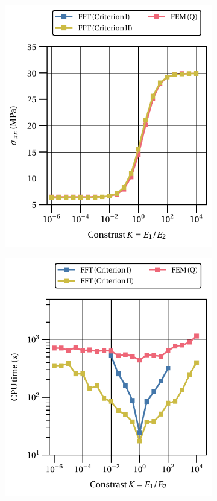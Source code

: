 \begin{figure}[hbt]
  \centering
	\begin{subfigure}[b]{0.49\textwidth}
    \centering
    \includegraphics[width=\textwidth]{figures/svk_2D_normal_stress_avg_vs_stiff_ratio}
    \caption{}
    \label{subfig:svk_2D_normal_stress_avg_vs_stiff_ratio}
  \end{subfigure}
  \begin{subfigure}[b]{0.49\textwidth}
    \centering
    \includegraphics[width=\textwidth]{figures/svk_2D_normal_stress_avg_cpu_time_vs_n_voxels}

\end{subfigure}
\end{figure}

